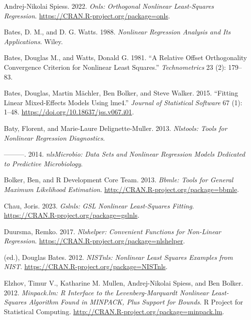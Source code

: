 \label{refs}
\setlength{\cslentryspacing}{0em}
\begin{CSLReferences}
Andrej-Nikolai Spiess. 2022. \emph{Onls: Orthogonal Nonlinear Least-Squares Regression}. \url{https://CRAN.R-project.org/package=onls}.

Bates, D. M., and D. G. Watts. 1988. \emph{Nonlinear Regression Analysis and Its Applications}. Wiley.

Bates, Douglas M., and Watts, Donald G. 1981. {``A Relative Offset Orthogonality Convergence Criterion for Nonlinear Least Squares.''} \emph{Technometrics} 23 (2): 179--83.

Bates, Douglas, Martin Mächler, Ben Bolker, and Steve Walker. 2015. {``Fitting Linear Mixed-Effects Models Using {lme4}.''} \emph{Journal of Statistical Software} 67 (1): 1--48. \url{https://doi.org/10.18637/jss.v067.i01}.

Baty, Florent, and Marie-Laure Delignette-Muller. 2013. \emph{Nlstools: Tools for Nonlinear Regression Diagnostics}.

---------. 2014. \emph{nlsMicrobio: Data Sets and Nonlinear Regression Models Dedicated to Predictive Microbiology}.

Bolker, Ben, and R Development Core Team. 2013. \emph{Bbmle: Tools for General Maximum Likelihood Estimation}. \url{http://CRAN.R-project.org/package=bbmle}.

Chau, Joris. 2023. \emph{Gslnls: GSL Nonlinear Least-Squares Fitting}. \url{https://CRAN.R-project.org/package=gslnls}.

Duursma, Remko. 2017. \emph{Nlshelper: Convenient Functions for Non-Linear Regression}. \url{https://CRAN.R-project.org/package=nlshelper}.

(ed.), Douglas Bates. 2012. \emph{NISTnls: Nonlinear Least Squares Examples from NIST}. \url{https://CRAN.R-project.org/package=NISTnls}.

Elzhov, Timur V., Katharine M. Mullen, Andrej-Nikolai Spiess, and Ben Bolker. 2012. \emph{Minpack.lm: R Interface to the Levenberg-Marquardt Nonlinear Least-Squares Algorithm Found in MINPACK, Plus Support for Bounds}. R Project for Statistical Computing. \url{http://CRAN.R-project.org/package=minpack.lm}.


\end{CSLReferences}
